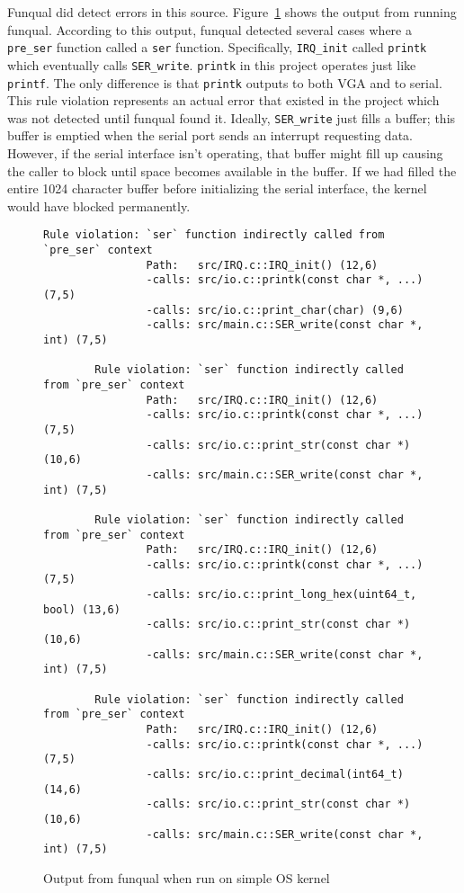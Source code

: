Funqual did detect errors in this source.  Figure~\ref{lst:app:pre-malloc:output} shows the output from running funqual.  According to this output, funqual detected several cases where a \lstinline{pre_ser} function called a \lstinline{ser} function.  Specifically, \lstinline{IRQ_init} called \lstinline{printk} which eventually calls \lstinline{SER_write}.  \lstinline{printk} in this project operates just like \lstinline{printf}.  The only difference is that \lstinline{printk} outputs to both VGA and to serial.  This rule violation represents an actual error that existed in the project which was not detected until funqual found it.  Ideally, \lstinline{SER_write} just fills a buffer; this buffer is emptied when the serial port sends an interrupt requesting data.  However, if the serial interface isn't operating, that buffer might fill up causing the caller to block until space becomes available in the buffer.  If we had filled the entire 1024 character buffer before initializing the serial interface, the kernel would have blocked permanently.

\begin{figure}
    \begin{lstlisting}[gobble=8]
        Rule violation: `ser` function indirectly called from `pre_ser` context
                Path:   src/IRQ.c::IRQ_init() (12,6)
                -calls: src/io.c::printk(const char *, ...) (7,5)
                -calls: src/io.c::print_char(char) (9,6)
                -calls: src/main.c::SER_write(const char *, int) (7,5)

        Rule violation: `ser` function indirectly called from `pre_ser` context
                Path:   src/IRQ.c::IRQ_init() (12,6)
                -calls: src/io.c::printk(const char *, ...) (7,5)
                -calls: src/io.c::print_str(const char *) (10,6)
                -calls: src/main.c::SER_write(const char *, int) (7,5)

        Rule violation: `ser` function indirectly called from `pre_ser` context
                Path:   src/IRQ.c::IRQ_init() (12,6)
                -calls: src/io.c::printk(const char *, ...) (7,5)
                -calls: src/io.c::print_long_hex(uint64_t, bool) (13,6)
                -calls: src/io.c::print_str(const char *) (10,6)
                -calls: src/main.c::SER_write(const char *, int) (7,5)

        Rule violation: `ser` function indirectly called from `pre_ser` context
                Path:   src/IRQ.c::IRQ_init() (12,6)
                -calls: src/io.c::printk(const char *, ...) (7,5)
                -calls: src/io.c::print_decimal(int64_t) (14,6)
                -calls: src/io.c::print_str(const char *) (10,6)
                -calls: src/main.c::SER_write(const char *, int) (7,5)
    \end{lstlisting}
    \caption{Output from funqual when run on simple OS kernel}
    \label{lst:app:pre-malloc:output}
\end{figure}

